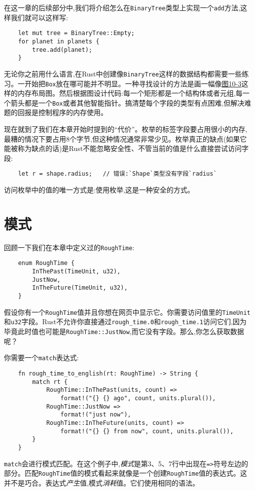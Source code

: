 在这一章的后续部分中,我们将介绍怎么在\texttt{BinaryTree}类型上实现一个\texttt{add}方法,这样我们就可以这样写:
\begin{verbatim}
    let mut tree = BinaryTree::Empty;
    for planet in planets {
        tree.add(planet);
    }
\end{verbatim}

无论你之前用什么语言,在Rust中创建像\texttt{BinaryTree}这样的数据结构都需要一些练习。一开始把\texttt{Box}放在哪可能并不明显。一种寻找设计的方法是画一幅像\hyperref[f10-3]{图10-3}这样的内存布局图。然后根据图设计代码:每一个矩形都是一个结构体或者元组,每一个箭头都是一个\texttt{Box}或者其他智能指针。搞清楚每个字段的类型有点困难,但解决难题的回报是控制程序的内存使用。 

现在就到了我们在本章开始时提到的“代价”。枚举的标签字段要占用很小的内存,最糟的情况下要占用8个字节,但这种情况通常非常少见。枚举真正的缺点(如果它能被称为缺点的话)是Rust不能忽略安全性、不管当前的值是什么直接尝试访问字段:
\begin{verbatim}
    let r = shape.radius;   // 错误:`Shape`类型没有字段`radius`
\end{verbatim}

访问枚举中的值的唯一方式是:使用枚举,这是一种安全的方式。

\section{模式}

回顾一下我们在本章中定义过的\texttt{RoughTime}:
\begin{verbatim}
    enum RoughTime {
        InThePast(TimeUnit, u32),
        JustNow,
        InTheFuture(TimeUnit, u32),
    }
\end{verbatim}

假设你有一个\texttt{RoughTime}值并且你想在网页中显示它。你需要访问值里的\texttt{TimeUnit}和\texttt{u32}字段。Rust不允许你直接通过\texttt{rough\_time.0}和\texttt{rough\_time.1}访问它们,因为毕竟此时值也可能是\texttt{RoughTime::JustNow},而它没有字段。那么,你怎么获取数据呢？

你需要一个\texttt{match}表达式:
\begin{verbatim}
    fn rough_time_to_english(rt: RoughTime) -> String {
        match rt {
            RoughTime::InThePast(units, count) =>
                format!("{} {} ago", count, units.plural()),
            RoughTime::JustNow =>
                format!("just now"),
            RoughTime::InTheFuture(units, count) =>
                format!("{} {} from now", count, units.plural()),
        }
    }
\end{verbatim}
\texttt{match}会进行模式匹配。在这个例子中,\emph{模式}是第3、5、7行中出现在\texttt{=>}符号左边的部分。匹配\texttt{RoughTime}值的模式看起来就像是一个创建\texttt{RoughTime}值的表达式。这并不是巧合。表达式\emph{产生}值,模式\emph{消耗}值。它们使用相同的语法。

